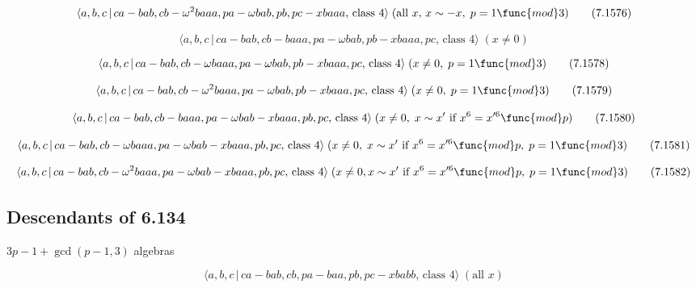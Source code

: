 \documentclass[10pt]{article}
\begin{document}
\begin{equation}
\langle a,b,c\,|\,ca-bab,cb-\omega ^{2}baaa,pa-\omega bab,pb,pc-xbaaa,\,%
\text{class }4\rangle \;(\text{all }x,\,x\sim -x,\;p=1\func{mod}3) 
\tag{7.1576}
\end{equation}

\begin{equation}
\langle a,b,c\,|\,ca-bab,cb-baaa,pa-\omega bab,pb-xbaaa,pc,\,\text{class }%
4\rangle \;(x\neq 0)  \tag{7.1577}
\end{equation}

\begin{equation}
\langle a,b,c\,|\,ca-bab,cb-\omega baaa,pa-\omega bab,pb-xbaaa,pc,\,\text{%
class }4\rangle \;(x\neq 0,\;p=1\func{mod}3)  \tag{7.1578}
\end{equation}

\begin{equation}
\langle a,b,c\,|\,ca-bab,cb-\omega ^{2}baaa,pa-\omega bab,pb-xbaaa,pc,\,%
\text{class }4\rangle \;(x\neq 0,\;p=1\func{mod}3)  \tag{7.1579}
\end{equation}

\begin{equation}
\langle a,b,c\,|\,ca-bab,cb-baaa,pa-\omega bab-xbaaa,pb,pc,\,\text{class }%
4\rangle \;(x\neq 0,\;x\sim x^{\prime }\text{ if }x^{6}=x^{\prime 6}\func{mod%
}p)  \tag{7.1580}
\end{equation}

\begin{equation}
\langle a,b,c\,|\,ca-bab,cb-\omega baaa,pa-\omega bab-xbaaa,pb,pc,\,\text{%
class }4\rangle \;(x\neq 0,\;x\sim x^{\prime }\text{ if }x^{6}=x^{\prime 6}%
\func{mod}p,\;p=1\func{mod}3)  \tag{7.1581}
\end{equation}

\begin{equation}
\langle a,b,c\,|\,ca-bab,cb-\omega ^{2}baaa,pa-\omega bab-xbaaa,pb,pc,\,%
\text{class }4\rangle \;(x\neq 0,x \sim x^{\prime }\text{ if }x^6=x^{\prime
6}\func{mod}p,\;p=1\func{mod}3)  \tag{7.1582}
\end{equation}

\subsection{Descendants of 6.134}

$3p-1+\gcd (p-1,3)$ algebras

\begin{equation}
\langle a,b,c\,|\,ca-bab,cb,pa-baa,pb,pc-xbabb,\,\text{class }4\rangle \;(%
\text{all }x)  \tag{7.1583}
\end{equation}
\end{document}
